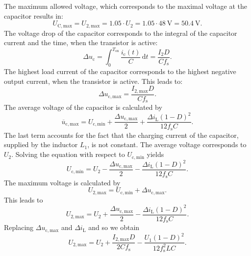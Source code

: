 \begin{solutionblock}
	The maximum allowed voltage, which corresponds to the maximal voltage at the capacitor results in:
	\begin{equation*}
		U_\mathrm{C,max} = U_\mathrm{2,max} = 1.05 \cdot U_\mathrm{2} = 1.05 \cdot \SI{48}{\volt} = \SI{50.4}{\volt}.
	\end{equation*}
	The voltage drop of the capacitor corresponds to the integral of the capacitor current and the time, when the transistor is active:
	\begin{equation*}
		\Delta u_\mathrm{c}= \int_{0}^{T_\mathrm{on}} \frac{i_\mathrm{c}(t) }{C} \,\mathrm{d}t = \frac{I_\mathrm{2} D}{C f_\mathrm{s}}.
	\end{equation*}
	The highest load current of the capacitor corresponds to the highest negative output current, when the transistor is active.
	This leads to:
	\begin{equation*}
		\Delta u_\mathrm{c,max}= \frac{I_\mathrm{2,max} D}{C f_\mathrm{s}}.
	\end{equation*}
	The average voltage of the capacitor is calculated by
	\begin{equation*}
		\overline u_\mathrm{c,max}= U_\mathrm{c,min} + \frac{\Delta u_\mathrm{c,max}}{2} + \frac{\Delta i_\mathrm{L}(1-D)^2}{12f_\mathrm{s}C}.
	\end{equation*}
	The last term accounts for the fact that the charging current of the capacitor, supplied by the inductor $L_1$, is not constant.
	The average voltage corresponds to $U_2$.
	Solving the equation with respect to $U_\mathrm{c,min}$ yields
	\begin{equation*}
		U_\mathrm{c,min} = U_\mathrm{2} - \frac{\Delta u_\mathrm{c,max}}{2} - \frac{\Delta i_\mathrm{L}(1-D)^2}{12f_\mathrm{s}C}.
	\end{equation*}
	The maximum voltage is calculated by
	\begin{equation*}
		U_\mathrm{2,max} = U_\mathrm{c,min} + \Delta u_\mathrm{c,max}.
	\end{equation*}
	This leads to
	\begin{equation*}
		U_\mathrm{2,max} = U_\mathrm{2} + \frac{\Delta u_\mathrm{c,max}}{2} - \frac{\Delta i_\mathrm{L}(1-D)^2}{12f_\mathrm{s}C}.
	\end{equation*}
	Replacing $\Delta u_\mathrm{c,max}$ and $\Delta i_\mathrm{L}$ and so we obtain
	\begin{equation*}
		U_\mathrm{2,max} = U_\mathrm{2} + \frac{I_\mathrm{2,max} D}{2C f_\mathrm{s}} - \frac{U_\mathrm{1}(1-D)^2}{12f_\mathrm{s}^2LC}.

\end{equation*}
\end{solutionblock}
